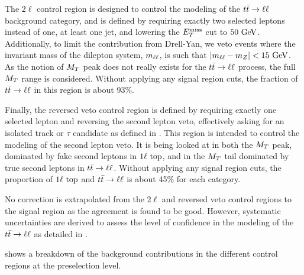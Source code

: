     The $2\ell$ control region is designed to control the modeling of the
    $t\bar{t} \rightarrow \ell \ell$ background category, and is defined by requiring exactly two
    selected leptons instead of one, at least one jet, and lowering the $E_T^\text{miss}$
    cut to $50 ~\text{GeV}$. Additionally, to limit the contribution from Drell-Yan, we
    veto events where the invariant mass of the dilepton system,
    $m_{\ell\ell}$, is such that $\left|m_{\ell\ell} - m_{Z}\right| < 15
    ~\text{GeV}$.  As the notion of $M_T$ peak does not really exists for the
    $t\bar{t} \rightarrow \ell \ell$ process, the full $M_T$ range is considered. Without applying
    any signal region cuts, the fraction of $t\bar{t} \rightarrow \ell \ell$ in this region is
    about 93\%.

    Finally, the reversed veto control region is defined by requiring exactly
    one selected lepton and reversing the second lepton veto, effectively asking
    for an isolated track or $\tau$ candidate as defined in
    . This region is intended to control the
    modeling of the second lepton veto. It is being looked at in both the $M_T$
    peak, dominated by fake second leptons in $1\ell~\text{top}$, and in the $M_T$
    tail dominated by true second leptons in $t\bar{t} \rightarrow \ell \ell$. Without applying
    any signal region cuts, the proportion of $1\ell~\text{top}$ and $t\bar{t} \rightarrow \ell \ell$
    is about 45\% for each category.

    No correction is extrapolated from the $2\ell$ and reversed veto control
    regions to the signal region as the agreement is found to be good. However,
    systematic uncertainties are derived to assess the level of confidence in
    the modeling of the $t\bar{t} \rightarrow \ell \ell$ as detailed in
    .

     shows a breakdown of the background
    contributions in the different control regions at the preselection level.


